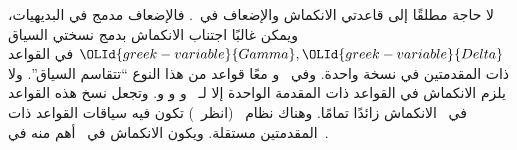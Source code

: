 \documentclass[../../../include/open-logic-section]{subfiles}
\begin{document}
لا حاجة مطلقًا إلى قاعدتي الانكماش والإضعاف في~. فالإضعاف مدمج
في البديهيات، ويمكن غالبًا اجتناب الانكماش بدمج نسختي السياق
${\OLId{greek-variable}{Gamma}},{\OLId{greek-variable}{Delta}}$ في القواعد ذات المقدمتين في نسخة واحدة. وفي~
و معًا قواعد من هذا النوع ``تتقاسم السياق''. ولا يلزم الانكماش في
القواعد ذات المقدمة الواحدة إلا لـ~\RightR{\lor} و\LeftR{\land} و
\RightR{\lexists} و\LeftR{\lforall}. وتجعل نسخ هذه القواعد في~
الانكماش زائدًا تمامًا. وهناك نظام~ (انظر~) تكون
فيه سياقات القواعد ذات المقدمتين مستقلة. ويكون الانكماش في~ أهم
منه في~.


\end{document}
